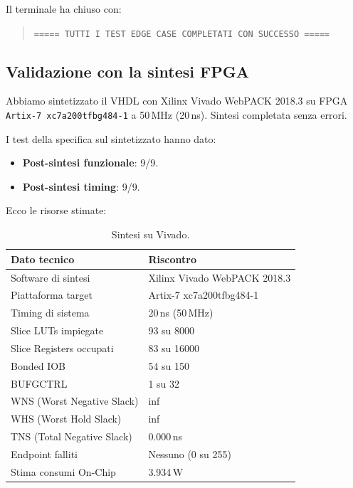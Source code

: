 \documentclass[a4paper,12pt]{article}
\begin{document}
\newpage   
Il terminale ha chiuso con:

\begin{quote}
\texttt{===== TUTTI I TEST EDGE CASE COMPLETATI CON SUCCESSO =====}
\end{quote}

\subsection{Validazione con la sintesi FPGA}

Abbiamo sintetizzato il VHDL con Xilinx Vivado WebPACK 2018.3 su FPGA \texttt{Artix-7 xc7a200tfbg484-1} a 50\,MHz (20\,ns). Sintesi completata senza errori.

I test della specifica sul sintetizzato hanno dato:
\begin{itemize}
    \item \textbf{Post-sintesi funzionale}: 9/9.
    \item \textbf{Post-sintesi timing}: 9/9.
\end{itemize}

Ecco le risorse stimate:

\begin{table}[H]
\centering
\begin{tabular}{ll}
\toprule
Dato tecnico & Riscontro \\
\midrule
Software di sintesi & Xilinx Vivado WebPACK 2018.3 \\
Piattaforma target & Artix-7 xc7a200tfbg484-1 \\
Timing di sistema & 20\,ns (50\,MHz) \\
Slice LUTs impiegate & 93 su 8000 \\
Slice Registers occupati & 83 su 16000 \\
Bonded IOB & 54 su 150 \\
BUFGCTRL & 1 su 32 \\
WNS (Worst Negative Slack) & inf \\
WHS (Worst Hold Slack) & inf \\
TNS (Total Negative Slack) & 0.000\,ns \\
Endpoint falliti & Nessuno (0 su 255) \\
Stima consumi On-Chip & 3.934\,W \\
\bottomrule
\end{tabular}
\caption{Sintesi su Vivado.}
\label{tab:sintesi}
\end{table}

\newpage
\end{document}

